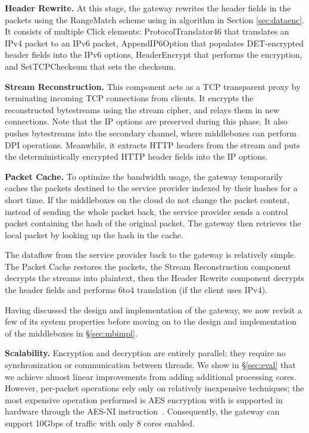 \noindent\textbf{Header Rewrite.} At this stage, the gateway rewrites the header fields in the packets using the RangeMatch scheme using in algorithm in Section \ref{sec:dataenc}. It consists of multiple Click elements: ProtocolTranslator46 that translates an IPv4 packet to an IPv6 packet, AppendIP6Option that populates DET-encrypted header fields into the IPv6 options, HeaderEncrypt that performs the encryption, and SetTCPChecksum that sets the checksum.

\noindent\textbf{Stream Reconstruction.} This component acts as a TCP transparent proxy by terminating incoming TCP connections from clients. It encrypts the reconstructed bytestreams using the stream cipher, and relays them in new connections. Note that the IP options are preserved during this phase. It also pushes bytestreams into the secondary channel, where middleboxes can perform DPI operations. Meanwhile, it extracts HTTP headers from the stream and puts the deterministically encrypted HTTP header fields into the IP options.

\noindent\textbf{Packet Cache.} To optimize the bandwidth usage, the gateway temporarily caches the packets destined to the service provider indexed by their hashes for a short time. If the middleboxes on the cloud do not change the packet content, instead of sending the whole packet back, the service provider sends a control packet containing the hash of the original packet. The gateway then retrieves the local packet by looking up the hash in the cache.

The dataflow from the service provider back to the gateway is relatively simple. The Packet Cache restores the packets, the Stream Reconstruction component decrypts the streams into plaintext, then the Header Rewrite component decrypts the header fields and performs 6to4 translation (if the client uses IPv4).

Having discussed the design and implementation of the gateway, we now revisit a few of its system properties before moving on to the design and implementation of the middleboxes in \S\ref{sec:mbimpl}.

\noindent\textbf{Scalability.}
Encryption and decryption are entirely parallel: they require no synchronization or communication between threads. We show in \S\ref{sec:eval} that we achieve almost linear improvements from adding additional processing cores.
However, per-packet operations rely only on relatively inexpensive techniques; the most expensive operation performed is AES encryption with is supported in hardware through the AES-NI instruction~\cite{aes-ni}. 
Consequently, the gateway can support 10Gbps of traffic with only 8 cores enabled.

